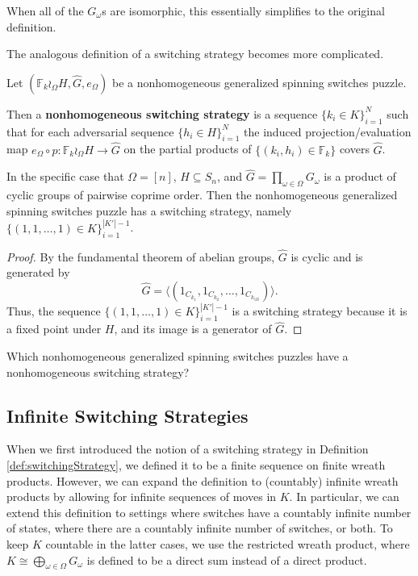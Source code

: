 When all of the $G_\omega$s are isomorphic, this essentially simplifies to the
original definition.

The analogous definition of a switching strategy becomes more complicated.

\begin{definition}
  Let $(\mathbb F_k \wr_\Omega H, \hat{G}, e_\Omega)$ be a nonhomogeneous
  generalized spinning switches puzzle.

  Then a \textbf{nonhomogeneous switching strategy} is a sequence
  $\{k_i \in K\}_{i=1}^{N}$
  such that for each adversarial sequence $\{h_i \in H\}_{i=1}^{N}$
  the induced projection/evaluation map
  $e_\Omega \circ p \colon \mathbb F_k \wr_\Omega H \rightarrow \hat{G}$
  on the partial products of $\{(k_i, h_i) \in \mathbb F_k\}$
  covers $\hat{G}$.
\end{definition}

\begin{proposition}
  In the specific case that $\Omega = [n]$, $H \subseteq S_n$, and
  $\hat{G} = \prod_{\omega \in \Omega} G_\omega$ is a product of cyclic groups of
  pairwise coprime order.
  Then the nonhomogeneous generalized spinning switches puzzle has a switching
  strategy, namely $\{(1,1,\dots,1) \in K\}_{i = 1}^{|K'| - 1}$.
\end{proposition}

\begin{proof}
  By the fundamental theorem of abelian groups, $\hat{G}$ is cyclic and is
  generated by \[
    \hat{G} = \langle(1_{C_{k_1}}, 1_{C_{k_2}}, \dots, 1_{C_{k_{|\Omega|}}})\rangle.
  \]
  Thus, the sequence $\{(1,1,\dots,1) \in K\}_{i=1}^{|K'|-1}$ is a switching
  strategy because it is a fixed point under $H$, and its image is a generator
  of $\hat{G}$.
\end{proof}

\begin{openquestion}
  Which nonhomogeneous generalized spinning switches puzzles have
  a nonhomogeneous switching strategy?
\end{openquestion}

\subsection{Infinite Switching Strategies}
When we first introduced the notion of a switching strategy in
Definition \ref{def:switchingStrategy},
we defined it to be a finite sequence on finite wreath products.
However, we can expand the definition to (countably) infinite wreath products
by allowing for infinite sequences of moves in $K$.
In particular, we can extend this definition to settings where
switches have a countably infinite number of states,
where there are a countably infinite number of switches,
or both.
To keep $K$ countable in the latter cases,
we use the restricted wreath product, where
$K \cong \bigoplus_{\omega \in \Omega} G_\omega$ is defined to be a direct
sum instead of a direct product.

